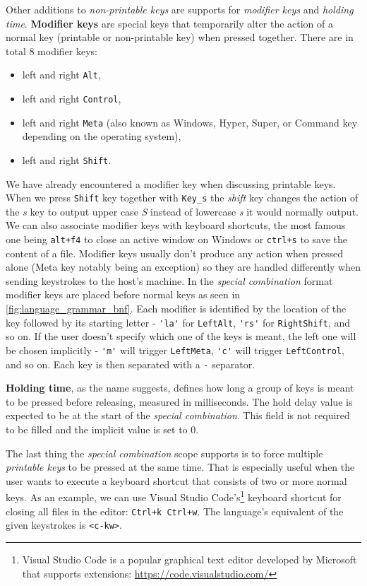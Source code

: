 Other additions to \emph{non-printable keys} are supports for \emph{modifier keys} and \emph{holding time}. \textbf{Modifier keys} are special keys that temporarily alter the action of a normal key (printable or non-printable key) when pressed together. There are in total 8 modifier keys:
\begin{itemize}
    \item left and right \verb|Alt|,
    \item left and right \verb|Control|,
    \item left and right \verb|Meta| (also known as Windows, Hyper, Super, or Command key depending on the operating system),
    \item left and right \verb|Shift|.
\end{itemize}
 We have already encountered a modifier key when discussing printable keys. When we press \verb|Shift| key together with \verb|Key_s| the \emph{shift} key changes the action of the \emph{s} key to output upper case \emph{S} instead of lowercase \emph{s} it would normally output. We can also associate modifier keys with keyboard shortcuts, the most famous one being \verb|alt+f4| to close an active window on Windows or \verb|ctrl+s| to save the content of a file. Modifier keys usually don't produce any action when pressed alone (Meta key notably being an exception) so they are handled differently when sending keystrokes to the host's machine. In the \emph{special combination} format modifier keys are placed before normal keys as seen in \autoref{fig:language_grammar_bnf}. Each modifier is identified by the location of the key followed by its starting letter \-- \verb|'la'| for \verb|LeftAlt|, \verb|'rs'| for \verb|RightShift|, and so on. If the user doesn't specify which one of the keys is meant, the left one will be chosen implicitly \-- \verb|'m'| will trigger \verb|LeftMeta|, \verb|'c'| will trigger \verb|LeftControl|, and so on. Each key is then separated with a \verb|-| separator.

\textbf{Holding time}, as the name suggests, defines how long a group of keys is meant to be pressed before releasing, measured in milliseconds. The hold delay value is expected to be at the start of the \emph{special combination}. This field is not required to be filled and the implicit value is set to 0. 

The last thing the \emph{special combination} scope supports is to force multiple \emph{printable keys} to be pressed at the same time. That is especially useful when the user wants to execute a keyboard shortcut that consists of two or more normal keys. As an example, we can use Visual Studio Code's\footnote{Visual Studio Code is a popular graphical text editor developed by Microsoft that supports extensions: \url{https://code.visualstudio.com/}} keyboard shortcut for closing all files in the editor: \verb|Ctrl+k Ctrl+w|. The language's equivalent of the given keystrokes is \verb|<c-kw>|. 


